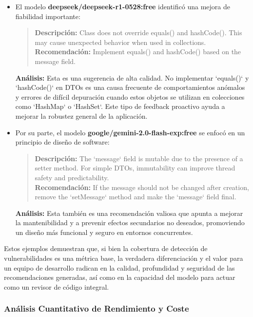 \begin{itemize}
    \item El modelo \textbf{deepseek/deepseek-r1-0528:free} identificó una mejora de fiabilidad importante:
    \begin{quote}
        \textbf{Descripción:} Class does not override equals() and hashCode(). This may cause unexpected behavior when used in collections. \\
        \textbf{Recomendación:} Implement equals() and hashCode() based on the message field.
    \end{quote}
    \textbf{Análisis:} Esta es una sugerencia de alta calidad. No implementar `equals()` y `hashCode()` en DTOs es una causa frecuente de comportamientos anómalos y errores de difícil depuración cuando estos objetos se utilizan en colecciones como `HashMap` o `HashSet`. Este tipo de feedback proactivo ayuda a mejorar la robustez general de la aplicación.

    \item Por su parte, el modelo \textbf{google/gemini-2.0-flash-exp:free} se enfocó en un principio de diseño de software:
    \begin{quote}
        \textbf{Descripción:} The `message` field is mutable due to the presence of a setter method. For simple DTOs, immutability can improve thread safety and predictability. \\
        \textbf{Recomendación:} If the message should not be changed after creation, remove the `setMessage` method and make the `message` field final.
    \end{quote}
    \textbf{Análisis:} Esta también es una recomendación valiosa que apunta a mejorar la mantenibilidad y a prevenir efectos secundarios no deseados, promoviendo un diseño más funcional y seguro en entornos concurrentes.
\end{itemize}

Estos ejemplos demuestran que, si bien la cobertura de detección de vulnerabilidades es una métrica base, la verdadera diferenciación y el valor para un equipo de desarrollo radican en la calidad, profundidad y seguridad de las recomendaciones generadas, así como en la capacidad del modelo para actuar como un revisor de código integral.

\subsubsection{Análisis Cuantitativo de Rendimiento y Coste}

